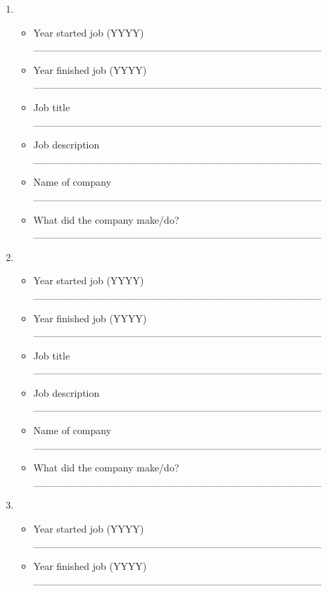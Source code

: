 \documentclass[a4paper,10pt]{article}
\begin{document}
\begin{enumerate}
 \item
     \begin{itemize}
         \item Year started job (YYYY) \_\_\_\_\_\_\_\_\_\_\_\_\_\_\_\_\_\_\_\_\_\_\_\_\_\_\_\_\_\_\_\_\_\_\_\_\_\_\_ 
         \item Year finished job (YYYY) \_\_\_\_\_\_\_\_\_\_\_\_\_\_\_\_\_\_\_\_\_\_\_\_\_\_\_\_\_\_\_\_\_\_\_\_\_\_\_
         \item Job title \_\_\_\_\_\_\_\_\_\_\_\_\_\_\_\_\_\_\_\_\_\_\_\_\_\_\_\_\_\_\_\_\_\_\_\_\_\_\_
         \item Job description \_\_\_\_\_\_\_\_\_\_\_\_\_\_\_\_\_\_\_\_\_\_\_\_\_\_\_\_\_\_\_\_\_\_\_\_\_\_\_
         \item Name of company \_\_\_\_\_\_\_\_\_\_\_\_\_\_\_\_\_\_\_\_\_\_\_\_\_\_\_\_\_\_\_\_\_\_\_\_\_\_\_
         \item What did the company make/do? \_\_\_\_\_\_\_\_\_\_\_\_\_\_\_\_\_\_\_\_\_\_\_\_\_\_\_\_\_\_\_\_\_\_\_\_\_\_\_
      \end{itemize}
 \item
     \begin{itemize}
         \item Year started job (YYYY) \_\_\_\_\_\_\_\_\_\_\_\_\_\_\_\_\_\_\_\_\_\_\_\_\_\_\_\_\_\_\_\_\_\_\_\_\_\_\_ 
         \item Year finished job (YYYY) \_\_\_\_\_\_\_\_\_\_\_\_\_\_\_\_\_\_\_\_\_\_\_\_\_\_\_\_\_\_\_\_\_\_\_\_\_\_\_
         \item Job title \_\_\_\_\_\_\_\_\_\_\_\_\_\_\_\_\_\_\_\_\_\_\_\_\_\_\_\_\_\_\_\_\_\_\_\_\_\_\_
         \item Job description \_\_\_\_\_\_\_\_\_\_\_\_\_\_\_\_\_\_\_\_\_\_\_\_\_\_\_\_\_\_\_\_\_\_\_\_\_\_\_
         \item Name of company \_\_\_\_\_\_\_\_\_\_\_\_\_\_\_\_\_\_\_\_\_\_\_\_\_\_\_\_\_\_\_\_\_\_\_\_\_\_\_
         \item What did the company make/do? \_\_\_\_\_\_\_\_\_\_\_\_\_\_\_\_\_\_\_\_\_\_\_\_\_\_\_\_\_\_\_\_\_\_\_\_\_\_\_
      \end{itemize}
 \item
     \begin{itemize}
         \item Year started job (YYYY) \_\_\_\_\_\_\_\_\_\_\_\_\_\_\_\_\_\_\_\_\_\_\_\_\_\_\_\_\_\_\_\_\_\_\_\_\_\_\_ 
         \item Year finished job (YYYY) \_\_\_\_\_\_\_\_\_\_\_\_\_\_\_\_\_\_\_\_\_\_\_\_\_\_\_\_\_\_\_\_\_\_\_\_\_\_\_

\end{itemize}
\end{enumerate}
\end{document}

